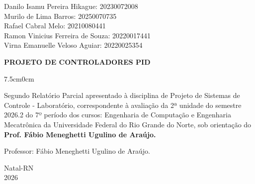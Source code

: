 \documentclass[a4paper,12pt]{article}
\begin{document}
\newpage


\thispagestyle{empty}

\begin{center}
\begin{normalsize}
Danilo Isamu Pereira Hikague: 20230072008\\
\vspace{0.8cm}
Murilo de Lima Barros: 20250070735\\
\vspace{0.8cm}
Rafael Cabral Melo: 20210080441\\
\vspace{0.8cm}
Ramon Vinicius Ferreira de Souza: 20220017441\\
\vspace{0.8cm}
Virna Emanuelle Veloso Aguiar: 20220025354\\

\end{normalsize}
\end{center}
\vspace{3cm}

{\bf{\large {\centering PROJETO DE CONTROLADORES PID\\
}}}

\vspace{4cm}

\begin{adjustwidth}{7.5cm}{0cm}

{\normalsize

Segundo Relatório Parcial apresentado à disciplina de
Projeto de Sistemas de Controle - Laboratório, correspondente à
avaliação da 2ª unidade do semestre 2026.2 do 7º período
dos cursos: Engenharia de Computação e Engenharia Mecatrônica da
Universidade Federal do Rio Grande do Norte, sob
orientação do {\bf Prof. Fábio Meneghetti Ugulino de
Araújo.}

}

\end{adjustwidth}

\vspace{2cm}

\begin{center}

Professor:  Fábio Meneghetti Ugulino de Araújo.

\vspace{2.5cm}

{\large Natal-RN\\
2026}

\end{center}
\end{document}
